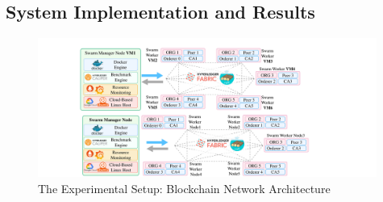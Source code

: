 \subsection{System Implementation and Results}
\label{sec:results}

\begin{figure}%
    \centering
    \includegraphics[width=0.99\textwidth]{Figures/ICC-vms1.pdf}
    \caption{The Experimental Setup: Blockchain Network Architecture}
    \label{fig:Arcitecture}
\end{figure}
